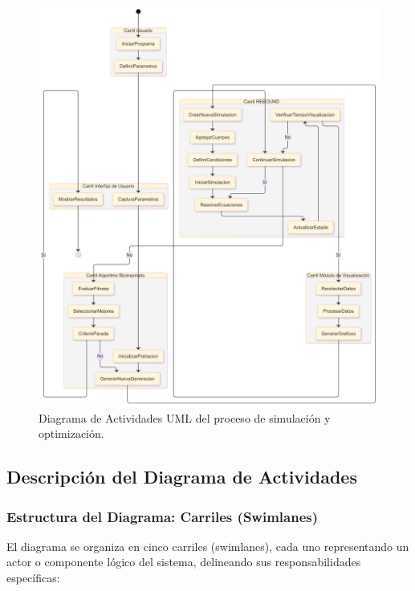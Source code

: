 \begin{figure}[H] %
    \centering
    \includegraphics[width=\textwidth]{img/Analisis/DiagramaActividades.png}
    \caption{Diagrama de Actividades UML del proceso de simulación y optimización.}%
    \label{fig:activity_diagram} %
\end{figure}

\subsection{Descripción del Diagrama de Actividades}

\subsubsection{Estructura del Diagrama: Carriles (Swimlanes)}

El diagrama se organiza en cinco carriles (swimlanes), cada uno representando un actor o componente lógico del sistema, delineando sus responsabilidades específicas:

